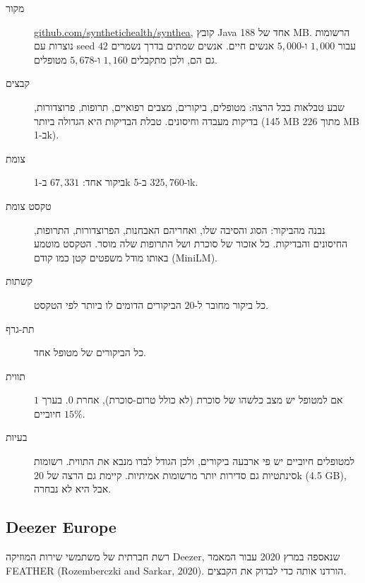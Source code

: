 \documentclass[11pt]{article}
\newcommand{\en}[1]{\foreignlanguage{english}{#1}}
\begin{document}
\begin{description}
\item[מקור] \href{https://github.com/synthetichealth/synthea}{\en{github.com/synthetichealth/synthea}},
קובץ \en{Java} אחד של \en{188 MB}. הרשומות נוצרות עם \en{seed} $42$ עבור $1{,}000$ ו-$5{,}000$
אנשים חיים. אנשים שמתים בדרך נשמרים גם הם, ולכן מתקבלים $1{,}160$ ו-$5{,}678$ מטופלים.
\item[קבצים] שבע טבלאות בכל הרצה: מטופלים, ביקורים, מצבים רפואיים, תרופות, פרוצדורות, בדיקות
מעבדה וחיסונים. טבלת הבדיקות היא הגדולה ביותר (\en{145 MB} מתוך \en{226 MB} ב-\en{1k}).
\item[צומת] ביקור אחד: $67{,}331$ ב-\en{1k} ו-$325{,}760$ ב-\en{5k}.
\item[טקסט צומת] נבנה מהביקור: הסוג והסיבה שלו, ואחריהם האבחנות, הפרוצדורות, התרופות, החיסונים
והבדיקות. כל אזכור של סוכרת ושל התרופות שלה מוסר. הטקסט מוטמע באותו מודל משפטים קטן כמו קודם
(\en{MiniLM}).
\item[קשתות] כל ביקור מחובר ל-$20$ הביקורים הדומים לו ביותר לפי הטקסט.
\item[תת-גרף] כל הביקורים של מטופל אחד.
\item[תווית] $1$ אם למטופל יש מצב כלשהו של סוכרת (לא כולל טרום-סוכרת), אחרת $0$. בערך $15\%$
חיוביים.
\item[בעיות] למטופלים חיוביים יש פי ארבעה ביקורים, ולכן הגודל לבדו מנבא את התווית. רשומות
סינתטיות גם סדירות יותר מרשומות אמיתיות. קיימת גם הרצה של \en{20k} (\en{4.5 GB}), אבל היא לא
נבחרה.
\end{description}

\subsection*{\en{Deezer Europe}}

רשת חברתית של משתמשי שירות המוזיקה \en{Deezer}, שנאספה במרץ 2020 עבור המאמר \en{FEATHER}
(\en{Rozemberczki and Sarkar, 2020}). הורדנו אותה כדי לבדוק את הקבצים.
\end{document}

